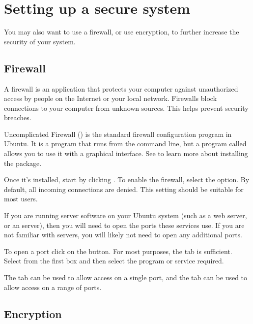 \section{Setting up a secure system}
\label{sec:security:setting-up-a-secure-system}

You may also want to use a firewall, or use encryption, to further increase the security of your system.

\subsection{Firewall}
\label{sec:security:firewall}
A firewall is an application that protects your computer against unauthorized access by people on the Internet or your local network. Firewalls block connections to your computer from unknown sources. This helps prevent security breaches.

Uncomplicated Firewall () is the standard firewall configuration program in Ubuntu. It is a program that runs from the command line, but a program called  allows you to use it with a graphical interface. See  to learn more about installing the  package.


Once it's installed, start  by clicking . To enable the firewall, select the  option. By default, all incoming connections are denied. This setting should be suitable for most users.

If you are running server software on your Ubuntu system (such as a web server, or an  server), then you will need to open the ports these services use. If you are not familiar with servers, you will likely not need to open any additional ports.

To open a port click on the  button. For most purposes, the  tab is sufficient. Select  from the first box and then select the program or service required.

The  tab can be used to allow access on a single port, and the  tab can be used to allow access on a range of ports.

\subsection{Encryption}
\label{sec:security:encryption}


